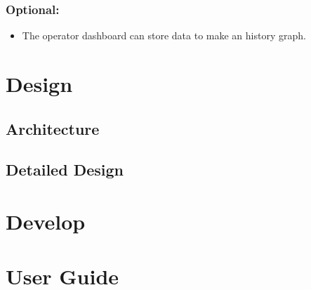 \documentclass[a4paper,12pt]{report}
\begin{document}
        \subsection{Optional:}
            
            \begin{itemize}
                \item The operator dashboard can store data to make an history graph.
            \end{itemize}

\chapter{Design}

        \section{Architecture}

        \section{Detailed Design}

\chapter{Develop}

\appendix
\chapter{User Guide}
\end{document}
